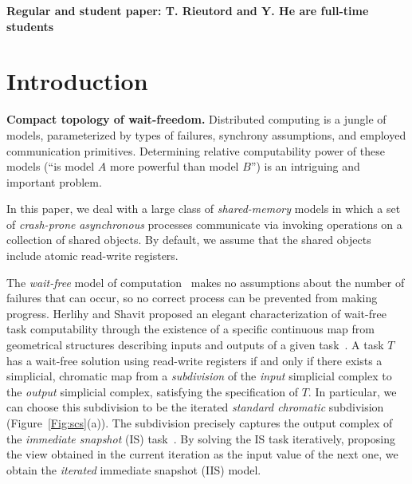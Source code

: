 \documentclass[a4paper]{article}
\newcommand{\myparagraph}[1]{\vspace{6pt}\noindent \textbf{#1}}
\begin{document}
\begin{center}
 {\bf Regular and student paper: T. Rieutord and Y. He are
   full-time students}
 \end{center}





\section{Introduction}

\myparagraph{Compact topology of wait-freedom.}
%
Distributed computing is a jungle of models, parameterized by 
types of failures, synchrony assumptions, and employed communication
primitives.
Determining relative computability power of these models (``is model
$A$ more powerful than model $B$'') is an intriguing and important
problem.

In this paper, we deal with a large class of \emph{shared-memory} models in which a set of
\emph{crash-prone} \emph{asynchronous} processes communicate
via invoking operations on a
collection of shared objects. By default, we assume that the shared objects include 
atomic read-write registers.  


The \emph{wait-free} model of computation~\cite{Her91} 
makes no assumptions about the number of failures that can occur, 
so no correct process can be prevented from making progress.
%
Herlihy and Shavit proposed an elegant 
characterization of wait-free task computability through the
existence of a specific continuous map from geometrical
structures describing inputs and outputs of a given
task~\cite{HS99}.
%
A task $T$ has a wait-free solution using read-write registers  
if and only if there exists a simplicial, chromatic map from a
\emph{subdivision}  of the \emph{input} simplicial complex to the \emph{output} simplicial complex,
satisfying the specification of $T$.
%
In particular, we can choose this subdivision to be the iterated
\emph{standard chromatic} subdivision %
(Figure~\ref{Fig:scs}(a)).
The subdivision precisely captures the output complex of the
\emph{immediate snapshot} (IS) task~\cite{BG97}.
By solving the IS task iteratively, proposing the view obtained in the
current iteration as the input value of the next one, we obtain the
\emph{iterated} immediate snapshot (IIS) model.
\end{document}
